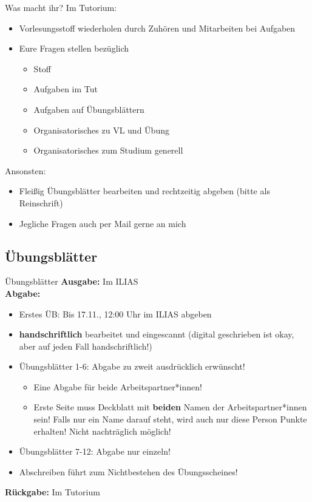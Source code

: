 {		\begin{frame}{Was macht ihr?}
			Im Tutorium:
			\begin{itemize}
				\item Vorlesungsstoff wiederholen durch Zuhören und Mitarbeiten bei Aufgaben
				\item Eure Fragen stellen bezüglich \begin{itemize}
					\item Stoff
					\item Aufgaben im Tut
					\item Aufgaben auf Übungsblättern
					\item Organisatorisches zu VL und Übung
					\item Organisatorisches zum Studium generell
				\end{itemize}
			\end{itemize}
			\pause
			\medskip
			Ansonsten:
			\begin{itemize}
				\item Fleißig Übungsblätter bearbeiten und rechtzeitig abgeben (bitte als Reinschrift)
				\item Jegliche Fragen auch per Mail gerne an mich
			\end{itemize}

		\end{frame}
	}
	
\subsection{Übungsblätter}
	\begin{frame}{Übungsblätter}
		\textbf{Ausgabe:} Im ILIAS \\
		\pause
		\textbf{Abgabe:}
			\begin{itemize}
				\item Erstes ÜB: Bis 17.11., 12:00 Uhr im ILIAS abgeben
				\pause
				\item \textbf{handschriftlich} bearbeitet und eingescannt (digital geschrieben ist okay, aber auf jeden Fall handschriftlich!)
				\item Übungsblätter 1-6: Abgabe zu zweit ausdrücklich erwünscht! \begin{itemize}
					\item Eine Abgabe für beide Arbeitspartner*innen!
					\item Erste Seite muss Deckblatt mit \textbf{beiden} Namen der Arbeitspartner*innen sein! Falls nur ein Name darauf steht, wird auch nur diese Person Punkte erhalten! Nicht nachträglich möglich!
				\end{itemize}	
				\item Übungsblätter 7-12: Abgabe nur einzeln!
				\item Abschreiben führt zum Nichtbestehen des Übungsscheines!
			\end{itemize}
		\pause	
		\textbf{Rückgabe:} Im Tutorium
	\end{frame}

